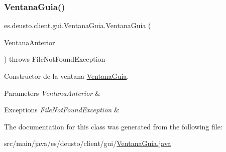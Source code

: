 \subsubsection{\texorpdfstring{VentanaGuia()}{VentanaGuia()}}
{\footnotesize\ttfamily es.\+deusto.\+client.\+gui.\+Ventana\+Guia.\+Ventana\+Guia (\begin{DoxyParamCaption}\item[{final J\+Frame}]{Ventana\+Anterior }\end{DoxyParamCaption}) throws File\+Not\+Found\+Exception}

Constructor de la ventana \mbox{\hyperlink{classes_1_1deusto_1_1client_1_1gui_1_1_ventana_guia}{Ventana\+Guia}}. 
\begin{DoxyParams}{Parameters}
{\em Ventana\+Anterior} & \\
\hline
\end{DoxyParams}

\begin{DoxyExceptions}{Exceptions}
{\em File\+Not\+Found\+Exception} & \\
\hline
\end{DoxyExceptions}


The documentation for this class was generated from the following file\+:\begin{DoxyCompactItemize}
\item 
src/main/java/es/deusto/client/gui/\mbox{\hyperlink{_ventana_guia_8java}{Ventana\+Guia.\+java}}\end{DoxyCompactItemize}
